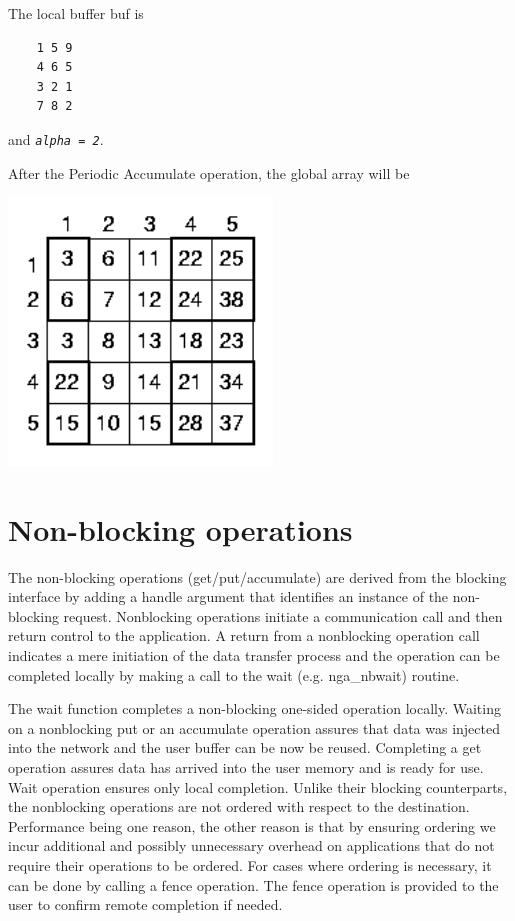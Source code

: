 The local buffer buf is
\begin{verbatim}
    1 5 9
    4 6 5
    3 2 1
    7 8 2
\end{verbatim}
and \texttt{\emph{alpha = 2}}.

After the Periodic Accumulate operation, the global array will be

\includegraphics[width=7cm]{periodic5}


\section{Non-blocking operations}

The non-blocking operations (get/put/accumulate) are derived from
the blocking interface by adding a handle argument that identifies
an instance of the non-blocking request. Nonblocking operations initiate
a communication call and then return control to the application. A
return from a nonblocking operation call indicates a mere initiation
of the data transfer process and the operation can be completed locally
by making a call to the wait (e.g. nga\_nbwait) routine.

The wait function completes a non-blocking one-sided operation locally.
Waiting on a nonblocking put or an accumulate operation assures that
data was injected into the network and the user buffer can be now
be reused. Completing a get operation assures data has arrived into
the user memory and is ready for use. Wait operation ensures only
local completion. Unlike their blocking counterparts, the nonblocking
operations are not ordered with respect to the destination. Performance
being one reason, the other reason is that by ensuring ordering we
incur additional and possibly unnecessary overhead on applications
that do not require their operations to be ordered. For cases where
ordering is necessary, it can be done by calling a fence operation.
The fence operation is provided to the user to confirm remote completion
if needed.


